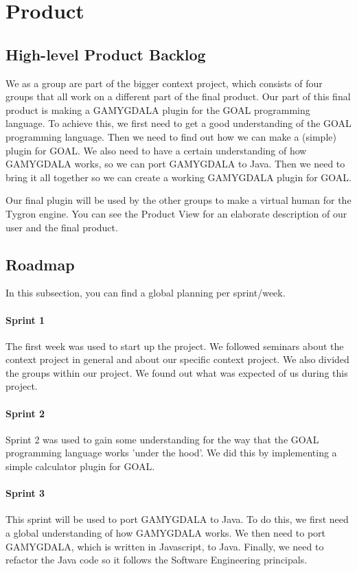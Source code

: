 \section{Product}
\subsection{High-level Product Backlog}
We as a group are part of the bigger context project, which consists of four groups that all work on a different part of the final product. Our part of this final product is making a GAMYGDALA plugin for the GOAL programming language. To achieve this, we first need to get a good understanding of the GOAL programming language. Then we need to find out how we can make a (simple) plugin for GOAL. We also need to have a certain understanding of how GAMYGDALA works, so we can port GAMYGDALA to Java. Then we need to bring it all together so we can create a working GAMYGDALA plugin for GOAL. \\ \par
Our final plugin will be used by the other groups to make a virtual human for the Tygron engine. You can see the Product View for an elaborate description of our user and the final product.

\subsection{Roadmap}
In this subsection, you can find a global planning per sprint/week.

\paragraph{Sprint 1} The first week was used to start up the project. We followed seminars about the context project in general and about our specific context project. We also divided the groups within our project. We found out what was expected of us during this project.
\paragraph{Sprint 2} Sprint 2 was used to gain some understanding for the way that the GOAL programming language works 'under the hood'. We did this by implementing a simple calculator plugin for GOAL.
\paragraph{Sprint 3} This sprint will be used to port GAMYGDALA to Java. To do this, we first need a global understanding of how GAMYGDALA works. We then need to port GAMYGDALA, which is written in Javascript, to Java. Finally, we need to refactor the Java code so it follows the Software Engineering principals.
